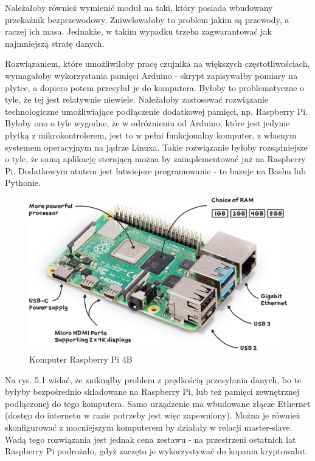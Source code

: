 Należałoby również wymienić moduł na taki, który posiada wbudowany przekaźnik bezprzewodowy. Zniwelowałoby to problem jakim są przewody, a raczej ich masa. Jednakże, w takim wypadku trzeba zagwarantować jak najmniejszą stratę danych.

Rozwiązaniem, które umożliwiłoby pracę czujnika na większych częstotliwościach, wymagałoby wykorzystania pamięci Arduino - skrypt zapisywałby pomiary na płytce, a dopiero potem przesyłał je do komputera. Byłoby to problematyczne o tyle, że tej jest relatywnie niewiele. Należałoby zastosować rozwiązanie technologiczne umożliwiające podłączenie dodatkowej pamięci, np. Raspberry Pi. Byłoby ono o tyle wygodne, że w odróżnieniu od Arduino, które jest jedynie płytką z mikrokontrolerem, jest to w pełni funkcjonalny komputer, z własnym systemem operacyjnym na jądrze Linuxa. Takie rozwiązanie byłoby rozsądniejsze o tyle, że samą aplikację sterującą można by zaimplementować już na Raspberry Pi. Dodatkowym atutem jest łatwiejsze programowanie - to bazuje na Bashu lub Pythonie.

\begin{figure}[H]
    \centering
    \includegraphics[width=\textwidth]{pictures/raspberry_pi_4.png}
    \caption{Komputer Raspberry Pi 4B \cite{pi}}
    \label{fig:rsp}
\end{figure}

Na rys. 5.1 widać, że zniknąłby problem z prędkością przesyłania danych, bo te byłyby bezpośrednio składowane na Raspberry Pi, lub też pamięci zewnętrznej podłączonej do tego komputera. Samo urządzenie ma wbudowane złącze Ethernet (dostęp do internetu w razie potrzeby jest więc zapewniony). Można je również skonfigurować z mocniejszym komputerem by działały w relacji master-slave. Wadą tego rozwiązania jest jednak cena zestawu - na przestrzeni ostatnich lat Raspberry Pi podrożało, gdyż zaczęto je wykorzystywać do kopania kryptowalut.

